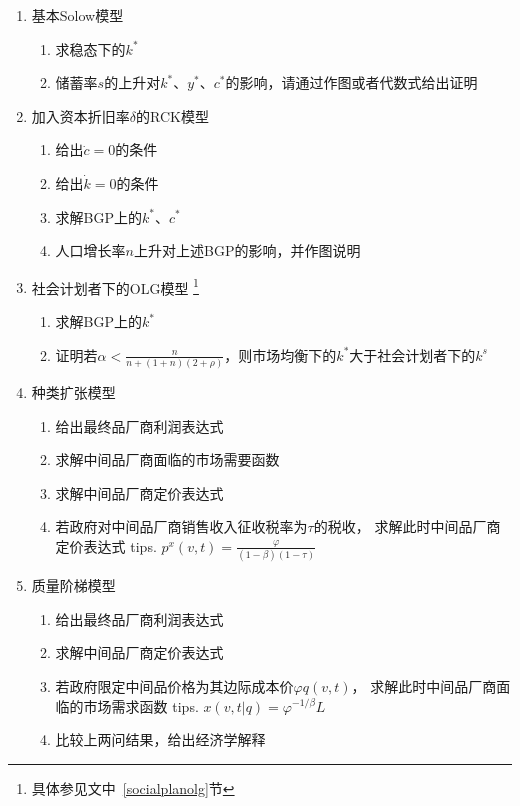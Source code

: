 \documentclass[cn,normal,11pt,black]{elegantnote}
\begin{document}
\begin{enumerate}
\item 基本Solow模型
        \begin{enumerate}
        \item 求稳态下的$k^*$
        \item 储蓄率$s$的上升对$k^*$、$y^*$、$c^*$的影响，请通过作图或者代数式给出证明
        \end{enumerate}
\item 加入资本折旧率$\delta$的RCK模型
        \begin{enumerate}
        \item 给出$\dot{c}=0$的条件
        \item 给出$\dot{k}=0$的条件
        \item 求解BGP上的$k^*$、$c^*$
        \item 人口增长率$n$上升对上述BGP的影响，并作图说明
        \end{enumerate}
\item 社会计划者下的OLG模型
        \footnote{具体参见文中~\ref{socialplanolg}节}
        \begin{enumerate}
        \item 求解BGP上的$k^*$
        \item 证明若$\alpha < \frac{n}{n + (1+n)(2+\rho)}$，则市场均衡下的$k^*$大于社会计划者下的$k^s$
        \end{enumerate}
\item 种类扩张模型
        \begin{enumerate}
        \item 给出最终品厂商利润表达式
        \item 求解中间品厂商面临的市场需要函数
        \item 求解中间品厂商定价表达式
        \item 若政府对中间品厂商销售收入征收税率为$\tau$的税收，
                求解此时中间品厂商定价表达式 \quad tips. $p^x(v,t) = \frac{\varphi}{(1-\beta)(1-\tau)}$
        \end{enumerate} 
\item 质量阶梯模型
        \begin{enumerate}
        \item 给出最终品厂商利润表达式
        \item 求解中间品厂商定价表达式
        \item 若政府限定中间品价格为其边际成本价$\varphi q(v,t)$，
                求解此时中间品厂商面临的市场需求函数 \quad tips. $x(v,t|q) = \varphi^{-1/\beta} L$
        \item 比较上两问结果，给出经济学解释
        \end{enumerate}        
\end{enumerate}
\end{document}
